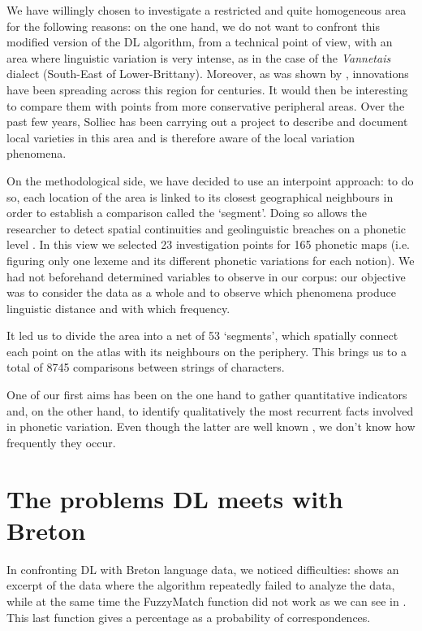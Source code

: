 \documentclass[output=paper]{LSP/langsci}
\begin{document}
We have willingly chosen to investigate a restricted and quite homogeneous area for the following reasons: on the one hand, we do not want to confront this modified version of the DL algorithm, from a technical point of view, with an area where linguistic variation is very intense, as in the case of the \textit{Vannetais} dialect (South-East of Lower-Brittany). Moreover, as was shown by \citet{falchun_perspectives_1981}, innovations have been spreading across this region for centuries. It would then be interesting to compare them with points from more conservative peripheral areas. Over the past few years, Solliec has been carrying out a project to describe and document local varieties in this area and is therefore aware of the local variation phenomena.

On the methodological side, we have decided to use an interpoint approach: to do so, each location of the area is linked to its closest geographical neighbours in order to establish a comparison called the ‘segment’. Doing so allows the researcher to detect spatial continuities and geolinguistic breaches on a phonetic level \citep[137]{goebl_introduction_2012}. In this view we selected 23 investigation points for 165 phonetic maps (i.e. figuring only one lexeme and its different phonetic variations for each notion). We had not beforehand determined variables to observe in our corpus: our objective was to consider the data as a whole and to observe which phenomena produce linguistic distance and with which frequency.

It led us to divide the area into a net of 53 ‘segments’, which spatially connect each point on the atlas with its neighbours on the periphery. This brings us to a total of 8745 comparisons between strings of characters.

One of our first aims has been on the one hand to gather quantitative indicators and, on the other hand, to identify qualitatively the most recurrent facts involved in phonetic variation. Even though the latter are well known \citep{falchun_perspectives_1981,jackson_historical_1967}, we don’t know how frequently they occur.

\section{The problems DL meets with Breton}

In confronting DL with Breton language data, we noticed difficulties:  shows an excerpt of the data where the algorithm repeatedly failed to analyze the data, while at the same time the FuzzyMatch function did not work as we can see in . This last function gives a percentage as a probability of correspondences.
\end{document}
